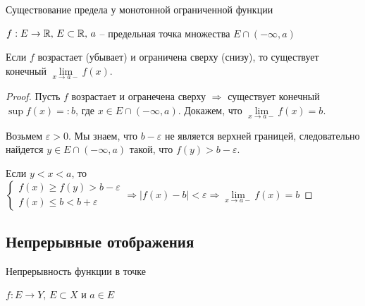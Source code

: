 \vspace{7mm}

\begin{theorem-non}
    Существование предела у монотонной ограниченной функции

    $f : E \to \mathbb{R}, \, E \subset \mathbb{R}, \, a$ -- предельная точка множества $E \cap (-\infty, a)$

    Если $f$ возрастает (убывает) и ограничена сверху (снизу), то существует конечный $\lim\limits_{x \to a-} f(x)$.
\end{theorem-non}
\begin{proof}
    Пусть $f$ возрастает и огранечена сверху $\Rightarrow$ существует конечный $\sup f(x) =: b$, где $x \in E \cap (-\infty, a)$.
    Докажем, что $\lim\limits_{x \to a-} f(x) = b$.

    Возьмем $\varepsilon > 0$. Мы знаем, что $b - \varepsilon$ не является верхней границей, следовательно найдется $y \in E \cap (-\infty, a)$ такой, что $f(y) > b - \varepsilon$.


    Если $y < x < a$, то $\begin{cases} f(x) \geqslant f(y) > b - \varepsilon \\ f(x) \leqslant b < b + \varepsilon \end{cases} \Rightarrow |f(x) - b| < \varepsilon \Rightarrow \lim\limits_{x \to a-} f(x) = b$
\end{proof}

\subsection{Непрерывные отображения}
\begin{conj}
    Непрерывность функции в точке 
\end{conj}
$f : E \to Y, \, E \subset X$ и $a \in E$

